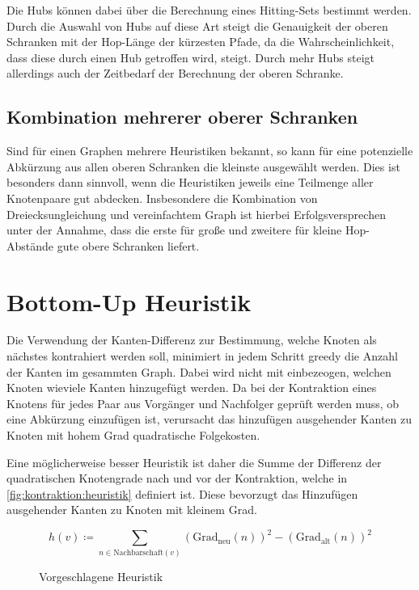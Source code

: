 Die Hubs können dabei über die Berechnung eines Hitting-Sets bestimmt werden.
Durch die Auswahl von Hubs auf diese Art steigt die Genauigkeit der oberen Schranken mit der Hop-Länge der kürzesten Pfade, da die Wahrscheinlichkeit, dass diese durch einen Hub getroffen wird, steigt.
Durch mehr Hubs steigt allerdings auch der Zeitbedarf der Berechnung der oberen Schranke.

\subsection{Kombination mehrerer oberer Schranken}
Sind für einen Graphen mehrere Heuristiken bekannt, so kann für eine potenzielle Abkürzung aus allen oberen Schranken die kleinste ausgewählt werden.
Dies ist besonders dann sinnvoll, wenn die Heuristiken jeweils eine Teilmenge aller Knotenpaare gut abdecken.
Insbesondere die Kombination von Dreiecksungleichung und vereinfachtem Graph ist hierbei Erfolgsversprechen unter der Annahme, dass die erste für große und zweitere für kleine Hop-Abstände gute obere Schranken liefert.

\section{Bottom-Up Heuristik}

Die Verwendung der Kanten-Differenz zur Bestimmung, welche Knoten als nächstes kontrahiert werden soll, minimiert in jedem Schritt greedy die Anzahl der Kanten im gesammten Graph.
Dabei wird nicht mit einbezeogen, welchen Knoten wieviele Kanten hinzugefügt werden.
Da bei der Kontraktion eines Knotens für jedes Paar aus Vorgänger und Nachfolger geprüft werden muss, ob eine Abkürzung einzufügen ist, verursacht das hinzufügen ausgehender Kanten zu Knoten mit hohem Grad quadratische Folgekosten.

Eine möglicherweise besser Heuristik ist daher die Summe der Differenz der quadratischen Knotengrade nach und vor der Kontraktion, welche in \autoref{fig:kontraktion:heuristik} definiert ist.
Diese bevorzugt das Hinzufügen ausgehender Kanten zu Knoten mit kleinem Grad.

\begin{figure}[h!]
  \begin{equation*}
    {h} (v) \coloneq \sum_{n \in \text{Nachbarschaft}(v)} (\text{Grad}_\text{neu}(n))^2 - (\text{Grad}_\text{alt}(n))^2
  \end{equation*}
  \caption{Vorgeschlagene Heuristik}
  \label{fig:kontraktion:heuristik}
\end{figure}

